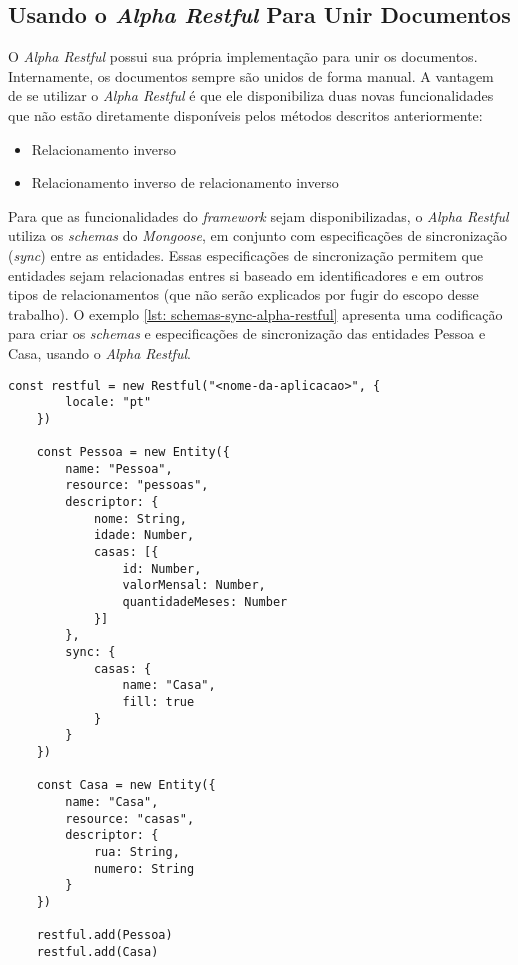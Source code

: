 
\subsection{Usando o \textit{Alpha Restful} Para Unir Documentos}

O \textit{Alpha Restful} possui sua própria implementação para unir os documentos. Internamente, os documentos sempre são unidos de forma manual. A vantagem de se utilizar o \textit{Alpha Restful} é que ele disponibiliza duas novas funcionalidades que não estão diretamente disponíveis pelos métodos descritos anteriormente:

\begin{itemize}
	\item Relacionamento inverso
	\item Relacionamento inverso de relacionamento inverso
\end{itemize}

Para que as funcionalidades do \textit{framework} sejam disponibilizadas, o \textit{Alpha Restful} utiliza os \textit{schemas} do \textit{Mongoose}, em conjunto com especificações de sincronização (\textit{sync}) entre as entidades. Essas especificações de sincronização permitem que entidades sejam relacionadas entres si baseado em identificadores e em outros tipos de relacionamentos (que não serão explicados por fugir do escopo desse trabalho). O exemplo \ref{lst: schemas-sync-alpha-restful} apresenta uma codificação para criar os \textit{schemas} e especificações de sincronização das entidades Pessoa e Casa, usando o \textit{Alpha Restful}.


\begin{lstlisting}[style=ES6, caption={Definição de \textit{Schemas} no \textit{Alpha Restful}\label{lst: schemas-sync-alpha-restful}}]
    const restful = new Restful("<nome-da-aplicacao>", {
        locale: "pt"
    })

    const Pessoa = new Entity({
        name: "Pessoa",
        resource: "pessoas",
        descriptor: {
            nome: String,
            idade: Number,
            casas: [{
                id: Number,
                valorMensal: Number,
                quantidadeMeses: Number
            }]
        },
        sync: {
            casas: {
                name: "Casa",
                fill: true
            }
        }
    })
    
    const Casa = new Entity({
        name: "Casa",
        resource: "casas",
        descriptor: {
            rua: String,
            numero: String
        }
    })
    
    restful.add(Pessoa)
    restful.add(Casa)
\end{lstlisting}

